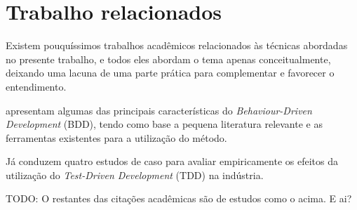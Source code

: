 \section{Trabalho relacionados} %
\label{sec:trabalho_relacionados}

Existem pouquíssimos trabalhos acadêmicos relacionados às técnicas abordadas no presente trabalho, e todos eles abordam o tema apenas conceitualmente, deixando uma lacuna de uma parte prática para complementar e favorecer o entendimento.

 apresentam algumas das principais características do \textit{Behaviour-Driven Development} (BDD), tendo como base a pequena literatura relevante e as ferramentas existentes para a utilização do método.

Já  conduzem quatro estudos de caso para avaliar empiricamente os efeitos da utilização do \textit{Test-Driven Development} (TDD) na indústria.

TODO: O restantes das citações acadêmicas são de estudos como o acima. E ai?

